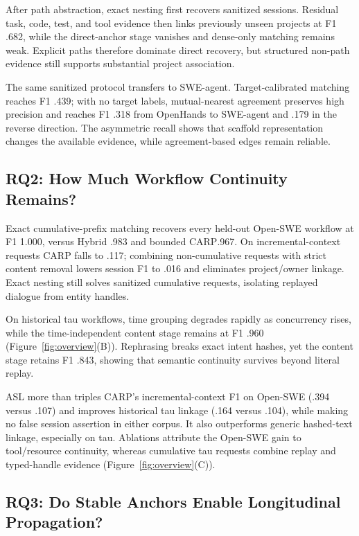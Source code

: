 \documentclass[letterpaper]{article} %
\newcommand{\carp}{\textsc{CARP}\xspace}
\newcommand{\asl}{\textsc{ASL}\xspace}
\begin{document}
After path abstraction, exact nesting first recovers sanitized sessions. Residual task, code, test,
and tool evidence then links previously unseen projects at F1 .682, while the direct-anchor stage
vanishes and dense-only matching remains weak. Explicit paths therefore dominate direct recovery,
but structured non-path evidence still supports substantial project association.

The same sanitized protocol transfers to SWE-agent. Target-calibrated matching reaches F1 .439; with
no target labels, mutual-nearest agreement preserves high precision and reaches F1 .318 from
OpenHands to SWE-agent and .179 in the reverse direction. The asymmetric recall shows that scaffold
representation changes the available evidence, while agreement-based edges remain reliable.

\subsection{RQ2: How Much Workflow Continuity Remains?}

Exact cumulative-prefix matching recovers every held-out Open-SWE workflow at F1 1.000, versus
Hybrid .983 and bounded \carp .967. On incremental-context requests \carp falls to .117; combining
non-cumulative requests with strict content removal lowers session F1 to .016 and eliminates
project/owner linkage. Exact nesting still solves sanitized cumulative requests, isolating replayed
dialogue from entity handles.

On historical tau workflows, time grouping degrades rapidly as concurrency rises, while the
time-independent content stage remains at F1 .960 (Figure~\ref{fig:overview}(B)). Rephrasing breaks
exact intent hashes, yet the content stage retains F1 .843, showing that semantic continuity survives
beyond literal replay.

\asl more than triples \carp's incremental-context F1 on Open-SWE (.394 versus .107) and improves
historical
tau linkage (.164 versus .104), while making no false session assertion in either corpus. It also
outperforms generic hashed-text linkage, especially on tau. Ablations attribute the Open-SWE gain to
tool/resource continuity, whereas cumulative tau requests combine replay and typed-handle evidence
(Figure~\ref{fig:overview}(C)).

\subsection{RQ3: Do Stable Anchors Enable Longitudinal Propagation?}
\end{document}
